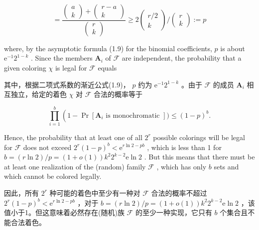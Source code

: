 \documentclass[10pt]{article}
\begin{document}
\[
= \frac{\left( \begin{array}{l} a \\  k \end{array}\right)  + \left( \begin{matrix} r - a \\  k \end{matrix}\right) }{\left( \begin{array}{l} r \\  k \end{array}\right) } \geq  2\left( \begin{matrix} r/2 \\  k \end{matrix}\right) /\left( \begin{array}{l} r \\  k \end{array}\right)  \mathrel{\text{ := }} p
\]

where, by the asymptotic formula (1.9) for the binomial coefficients, \(p\) is about \({\mathrm{e}}^{-1}{2}^{1 - k}\) . Since the members \({\mathbf{A}}_{i}\) of \(\mathcal{F}\) are independent, the probability that a given coloring \(\chi\) is legal for \(\mathcal{F}\) equals

\begin{tcolorbox}\relax
其中，根据二项式系数的渐近公式(1.9)， \(p\) 约为 \({\mathrm{e}}^{-1}{2}^{1 - k}\) 。由于 \(\mathcal{F}\) 的成员 \({\mathbf{A}}_{i}\) 相互独立，给定的着色 \(\chi\) 对 \(\mathcal{F}\) 合法的概率等于
\end{tcolorbox}

\[
\mathop{\prod }\limits_{{i = 1}}^{b}\left( {1 - \Pr \left\lbrack  {{\mathbf{A}}_{i}\text{ is monochromatic }}\right\rbrack  ) \leq  {\left( 1 - p\right) }^{b}.}\right.
\]

Hence, the probability that at least one of all \({2}^{r}\) possible colorings will be legal for \(\mathcal{F}\) does not exceed \({2}^{r}{\left( 1 - p\right) }^{b} < {\mathrm{e}}^{r\ln 2 - {pb}}\) , which is less than 1 for \(b = \left( {r\ln 2}\right) /p = \left( {1 + o\left( 1\right) }\right) {k}^{2}{2}^{k - 2}\mathrm{e}\ln 2\) . But this means that there must be at least one realization of the (random) family \(\mathcal{F}\) , which has only \(b\) sets and which cannot be colored legally.

\begin{tcolorbox}\relax
因此，所有 \({2}^{r}\) 种可能的着色中至少有一种对 \(\mathcal{F}\) 合法的概率不超过 \({2}^{r}{\left( 1 - p\right) }^{b} < {\mathrm{e}}^{r\ln 2 - {pb}}\) ，对于 \(b = \left( {r\ln 2}\right) /p = \left( {1 + o\left( 1\right) }\right) {k}^{2}{2}^{k - 2}\mathrm{e}\ln 2\) ，该值小于1。但这意味着必然存在(随机)族 \(\mathcal{F}\) 的至少一种实现，它只有 \(b\) 个集合且不能合法着色。
\end{tcolorbox}
\end{document}
